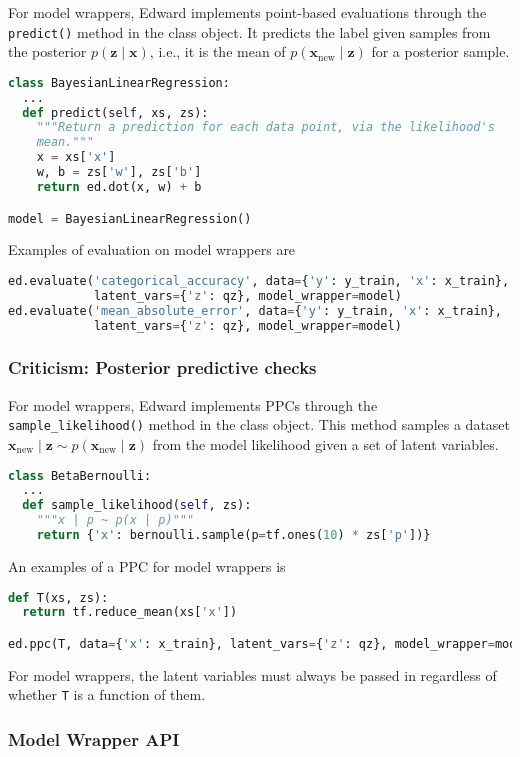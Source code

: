 For model wrappers, Edward implements point-based evaluations through
the \texttt{predict()} method in the class object. It predicts
the label given samples from the posterior $p(\mathbf{z} \mid \mathbf{x})$, i.e., it is
the mean of $p(\mathbf{x}_\text{new} \mid \mathbf{z})$ for a posterior sample.
\begin{lstlisting}[language=Python]
class BayesianLinearRegression:
  ...
  def predict(self, xs, zs):
    """Return a prediction for each data point, via the likelihood's
    mean."""
    x = xs['x']
    w, b = zs['w'], zs['b']
    return ed.dot(x, w) + b

model = BayesianLinearRegression()
\end{lstlisting}
Examples of evaluation on model wrappers are
\begin{lstlisting}[language=Python]
ed.evaluate('categorical_accuracy', data={'y': y_train, 'x': x_train},
            latent_vars={'z': qz}, model_wrapper=model)
ed.evaluate('mean_absolute_error', data={'y': y_train, 'x': x_train},
            latent_vars={'z': qz}, model_wrapper=model)
\end{lstlisting}

\subsubsection{Criticism: Posterior predictive checks}

For model wrappers, Edward implements PPCs through the
\texttt{sample_likelihood()} method in the class object. This method
samples a dataset
$\mathbf{x}_{\text{new}}\mid \mathbf{z}\sim
p(\mathbf{x}_{\text{new}}\mid \mathbf{z})$ from the
model likelihood given a set of latent variables.
\begin{lstlisting}[language=Python]
class BetaBernoulli:
  ...
  def sample_likelihood(self, zs):
    """x | p ~ p(x | p)"""
    return {'x': bernoulli.sample(p=tf.ones(10) * zs['p'])}
\end{lstlisting}

An examples of a PPC for model wrappers is
\begin{lstlisting}[language=Python]
def T(xs, zs):
  return tf.reduce_mean(xs['x'])

ed.ppc(T, data={'x': x_train}, latent_vars={'z': qz}, model_wrapper=model)
\end{lstlisting}
For model wrappers, the latent variables must always be
passed in regardless of whether \texttt{T} is a function of them.

\subsubsection{Model Wrapper API}

